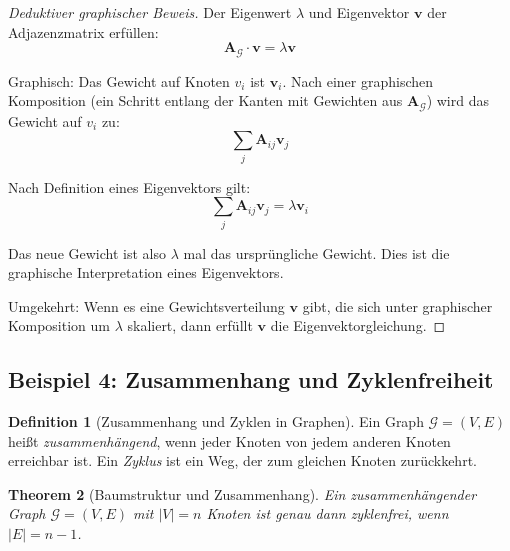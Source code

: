 \documentclass[12pt, a4paper]{article}
\newtheorem{theorem}{Theorem}[section]
\theoremstyle{definition}
\newtheorem{definition}[theorem]{Definition}
\theoremstyle{remark}
\newcommand{\vA}{\bm{A}}
\newcommand{\Graph}{\mathcal{G}}
\begin{document}
\begin{proof}[Deduktiver graphischer Beweis]
Der Eigenwert $\lambda$ und Eigenvektor $\mathbf{v}$ der Adjazenzmatrix erfüllen:
\[
  \vA_{\Graph} \cdot \mathbf{v} = \lambda \mathbf{v}
\]

Graphisch: Das Gewicht auf Knoten $v_i$ ist $\mathbf{v}_i$. Nach einer graphischen Komposition (ein Schritt entlang der Kanten mit Gewichten aus $\vA_{\Graph}$) wird das Gewicht auf $v_i$ zu:
\[
  \sum_{j} \vA_{ij} \mathbf{v}_j
\]

Nach Definition eines Eigenvektors gilt:
\[
  \sum_{j} \vA_{ij} \mathbf{v}_j = \lambda \mathbf{v}_i
\]

Das neue Gewicht ist also $\lambda$ mal das ursprüngliche Gewicht. Dies ist die graphische Interpretation eines Eigenvektors.

Umgekehrt: Wenn es eine Gewichtsverteilung $\mathbf{v}$ gibt, die sich unter graphischer Komposition um $\lambda$ skaliert, dann erfüllt $\mathbf{v}$ die Eigenvektorgleichung.
\end{proof}

\subsection{Beispiel 4: Zusammenhang und Zyklenfreiheit}
\label{subsec:beispiel_zusammenhang}

\begin{definition}[Zusammenhang und Zyklen in Graphen]
\label{def:zusammenhang_zyklen}
Ein Graph $\Graph = (V, E)$ heißt \emph{zusammenhängend}, wenn jeder Knoten von jedem anderen Knoten erreichbar ist. Ein \emph{Zyklus} ist ein Weg, der zum gleichen Knoten zurückkehrt.
\end{definition}

\begin{theorem}[Baumstruktur und Zusammenhang]
\label{thm:baum_zusammenhang}
Ein zusammenhängender Graph $\Graph = (V, E)$ mit $|V| = n$ Knoten ist genau dann zyklenfrei, wenn $|E| = n-1$.
\end{theorem}
\end{document}
